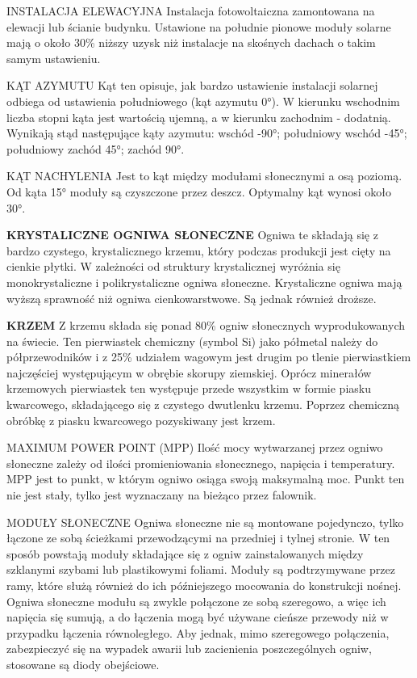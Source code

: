 \documentclass[12pt,a4paper]{article}
\begin{document}
INSTALACJA ELEWACYJNA
Instalacja fotowoltaiczna zamontowana na elewacji lub ścianie budynku. Ustawione na południe pionowe moduły solarne mają o około 30\% niższy uzysk niż instalacje na skośnych dachach o takim samym ustawieniu.


KĄT AZYMUTU
Kąt ten opisuje, jak bardzo ustawienie instalacji solarnej odbiega od ustawienia południowego (kąt azymutu 0°). W kierunku wschodnim liczba stopni kąta jest wartością ujemną, a w kierunku zachodnim - dodatnią. Wynikają stąd następujące kąty azymutu: wschód -90°; południowy wschód -45°; południowy zachód 45°; zachód 90°.


KĄT NACHYLENIA
Jest to kąt między modułami słonecznymi a osą poziomą. Od kąta 15° moduły są czyszczone przez deszcz. Optymalny kąt wynosi około 30°.


\textbf{KRYSTALICZNE OGNIWA SŁONECZNE}
Ogniwa te składają się z bardzo czystego, krystalicznego krzemu, który podczas produkcji jest cięty na cienkie płytki. W zależności od struktury krystalicznej wyróżnia się monokrystaliczne i polikrystaliczne ogniwa słoneczne. Krystaliczne ogniwa mają wyższą sprawność niż ogniwa cienkowarstwowe. Są jednak również droższe.


\textbf{KRZEM}
Z krzemu składa się ponad 80\% ogniw słonecznych wyprodukowanych na świecie. Ten pierwiastek chemiczny (symbol Si) jako półmetal należy do półprzewodników i z 25\% udziałem wagowym jest drugim po tlenie pierwiastkiem najczęściej występującym w obrębie skorupy ziemskiej. Oprócz minerałów krzemowych pierwiastek ten występuje przede wszystkim w formie piasku kwarcowego, składającego się z czystego dwutlenku krzemu. Poprzez chemiczną obróbkę z piasku kwarcowego pozyskiwany jest krzem.

MAXIMUM POWER POINT (MPP)
Ilość mocy wytwarzanej przez ogniwo słoneczne zależy od ilości promieniowania słonecznego, napięcia i temperatury. MPP jest to punkt, w którym ogniwo osiąga swoją maksymalną moc. Punkt ten nie jest stały, tylko jest wyznaczany na bieżąco przez falownik.

MODUŁY SŁONECZNE
Ogniwa słoneczne nie są montowane pojedynczo, tylko łączone ze sobą ścieżkami przewodzącymi na przedniej i tylnej stronie. W ten sposób powstają moduły składające się z ogniw zainstalowanych między szklanymi szybami lub plastikowymi foliami. Moduły są podtrzymywane przez ramy, które służą również do ich późniejszego mocowania do konstrukcji nośnej. Ogniwa słoneczne modułu są zwykle połączone ze sobą szeregowo, a więc ich napięcia się sumują, a do łączenia mogą być używane cieńsze przewody niż w przypadku łączenia równoległego. Aby jednak, mimo szeregowego połączenia, zabezpieczyć się na wypadek awarii lub zacienienia poszczególnych ogniw, stosowane są diody obejściowe.
\end{document}
